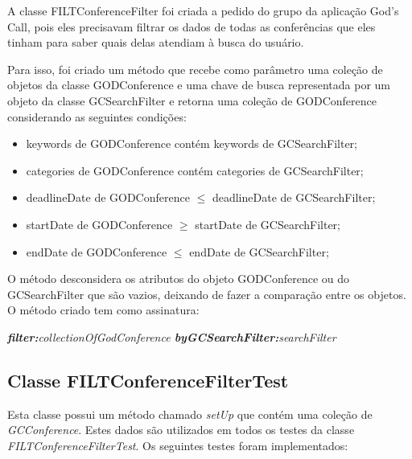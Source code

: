 A classe FILTConferenceFilter foi criada a pedido do grupo da aplicação God's Call, pois eles precisavam filtrar os dados de todas as conferências que eles tinham para saber quais delas atendiam à busca do usuário.

Para isso, foi criado um método que recebe como parâmetro uma coleção de objetos da classe GODConference e uma chave de busca representada por um objeto da classe GCSearchFilter e retorna uma coleção de GODConference considerando as seguintes condições:
\begin{itemize}
\item keywords de GODConference contém keywords de GCSearchFilter;
\item categories de GODConference contém categories de GCSearchFilter;
\item deadlineDate de GODConference $ \le $ deadlineDate de GCSearchFilter;
\item startDate de GODConference $ \ge $ startDate de GCSearchFilter;
\item endDate de GODConference $ \le $ endDate de GCSearchFilter;
\end{itemize}

O método desconsidera os atributos do objeto GODConference ou do GCSearchFilter que são vazios, deixando de fazer a comparação entre os objetos.\\

O método criado tem como assinatura:

\textit{\textbf{filter:}collectionOfGodConference \textbf{byGCSearchFilter:}searchFilter}

\subsection{Classe FILTConferenceFilterTest}

Esta classe possui um método chamado \textit{setUp} que contém uma coleção de \textit{GCConference}. Estes dados são utilizados em todos os testes da classe \textit{FILTConferenceFilterTest}. Os seguintes testes foram implementados:

